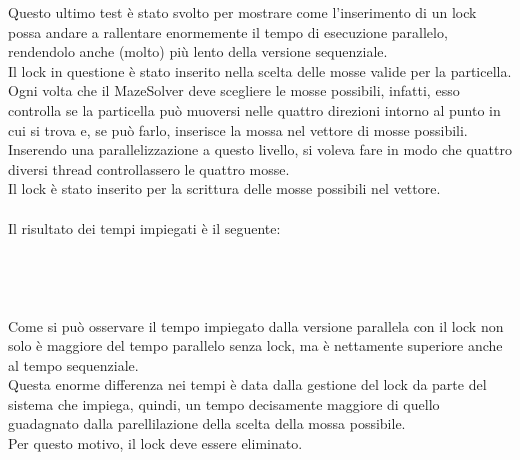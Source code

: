 \documentclass[10pt,twocolumn,letterpaper]{article}
\begin{document}
Questo ultimo test è stato svolto per mostrare come l'inserimento di un lock possa andare a rallentare enormemente il tempo di esecuzione parallelo, rendendolo anche (molto) più lento della versione sequenziale.\\
Il lock in questione è stato inserito nella scelta delle mosse valide per la particella. Ogni volta che il MazeSolver deve scegliere le mosse possibili, infatti, esso controlla se la particella può muoversi nelle quattro direzioni intorno al punto in cui si trova e, se può farlo, inserisce la mossa nel vettore di mosse possibili. Inserendo una parallelizzazione a questo livello, si voleva fare in modo che quattro diversi thread controllassero le quattro mosse.\\
Il lock è stato inserito per la scrittura delle mosse possibili nel vettore.\\
\\
Il risultato dei tempi impiegati è il seguente:
\\
\\
\\
\\
\\
Come si può osservare il tempo impiegato dalla versione parallela con il lock non solo è maggiore del tempo parallelo senza lock, ma è nettamente superiore anche al tempo sequenziale.\\
Questa enorme differenza nei tempi è data dalla gestione del lock da parte del sistema che impiega, quindi, un tempo decisamente maggiore di quello guadagnato dalla parellilazione della scelta della mossa possibile.\\
Per questo motivo, il lock deve essere eliminato.
\end{document}
